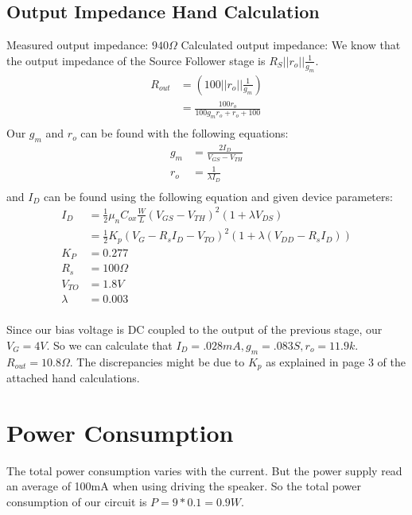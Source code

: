 \documentclass[11pt, twoside, letterpaper]{article}
\begin{document}
\subsection{Output Impedance Hand Calculation}
Measured output impedance: $940 \Omega$
Calculated output impedance:
We know that the output impedance of the Source Follower stage is $R_S || r_o || \frac{1}{g_m}$.
\begin{align*}
	R_{out} &= (100 || r_o || \frac{1}{g_m}) \\
	&= \frac{100r_o}{100g_m r_o + r_o + 100} \\
\end{align*}
Our $g_m$ and $r_o$ can be found with the following equations:
\begin{align*}
	g_m &= \frac{2 I_D}{V_{GS} - V_{TH}} \\
	r_o &= \frac{1}{\lambda I_D} \\
\end{align*}
and $I_D$ can be found using the following equation and given device parameters: 
\begin{align*}
	I_D &= \frac{1}{2} \mu_n C_{ox} \frac{W}{L}(V_{GS} -V_{TH})^2 (1+\lambda V_{DS}) \\
	&= \frac{1}{2}K_p (V_G - R_s I_D - V_{TO})^2 (1+ \lambda (V_{DD} - R_s I_D)) \\
	K_P &= 0.277 \\
	R_s &= 100 \Omega \\
	V_{TO} &= 1.8 V \\
	\lambda &= 0.003 \\
\end{align*}

Since our bias voltage is DC coupled to the output of the previous stage, our $V_G = 4 V$. 
So we can calculate that $I_D = .028 mA, g_m = .083 S, r_o = 11.9k$. $R_{out} = 10.8 \Omega$.
The discrepancies might be due to $K_p$ as explained in page 3 of the attached hand calculations.

\section{Power Consumption}
The total power consumption varies with the current. But the power supply read an average of 100mA when using driving the speaker.
So the total power consumption of our circuit is $P=9*0.1= 0.9W$.
\end{document}
